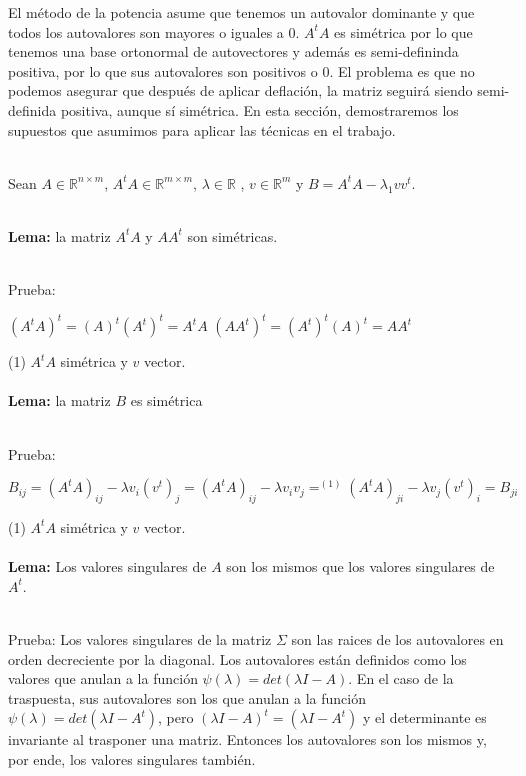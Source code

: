 El método de la potencia asume que tenemos un autovalor dominante y que todos los autovalores son
mayores o iguales a 0. $A^t A$ es simétrica por lo que tenemos una base ortonormal de autovectores
y además es semi-defininda positiva, por lo que sus autovalores son positivos o 0. El problema es
que no podemos asegurar que después de aplicar deflación, la matriz seguirá siendo semi-definida
positiva, aunque sí simétrica. En esta sección, demostraremos los supuestos que asumimos para
aplicar las técnicas en el trabajo.



\ \\

Sean $A \in \mathbb{R}^{n \times m}$, $A^t A \in \mathbb{R}^{m \times m}$, $\lambda \in \mathbb{R}$
, $v \in \mathbb{R}^m$ y $B = A^t A - \lambda_{1} v v^t$.

\ \\
\textbf{Lema:} la matriz $A^t A$ y $A A^t$ son simétricas.

\ \\
Prueba:

\begin{center}
  $(A^t A)^t = (A)^t (A^t)^t = A^t A$
  $(A A^t)^t = (A^t)^t (A)^t = A A^t$
\end{center}

(1) $A^t A$ simétrica y $v$ vector.
\ \\

\ \\
\textbf{Lema:} la matriz $B$ es simétrica

\ \\
Prueba:

\begin{center}
  $B_{ij} = (A^t A)_{ij} - \lambda v_i (v^t)_j = (A^t A)_{ij} - \lambda v_i v_j =^{(1)} (A^t A)_{ji}
  - \lambda v_j (v^t)_i = B_{ji}$
\end{center}

(1) $A^t A$ simétrica y $v$ vector.
\ \\


\ \\
\textbf{Lema:} Los valores singulares de $A$ son los mismos que los valores singulares de $A^t$.

\ \\
Prueba: Los valores singulares de la matriz $\Sigma$ son las raices de los autovalores en orden
decreciente por la diagonal. Los autovalores están definidos como los valores que anulan a la
función
$\psi(\lambda) = det(\lambda I - A)$. En el caso de la traspuesta, sus autovalores son los que
anulan a la función $\psi(\lambda) = det(\lambda I - A^t)$, pero $(\lambda I - A)^t = (\lambda I -
A^t)$ y el determinante es invariante al trasponer una matriz. Entonces los autovalores son los
mismos y, por ende, los valores singulares también.


